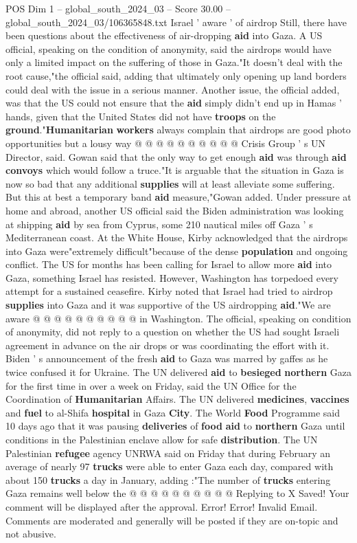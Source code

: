 \begin{textsample}{POS Dim 1 – global\_south\_2024\_03 – Score 30.00 – global\_south\_2024\_03/106365848.txt}
Israel ' aware ' of airdrop Still, there have been questions about the effectiveness of air-dropping \textbf{aid} into Gaza.
A US official, speaking on the condition of anonymity, said the airdrops would have only a limited impact on the suffering of those in Gaza."It doesn't deal with the root cause,"the official said, adding that ultimately only opening up land borders could deal with the issue in a serious manner.
Another issue, the official added, was that the US could not ensure that the \textbf{aid} simply didn't end up in Hamas ' hands, given that the United States did not have \textbf{troops} on the \textbf{ground}."\textbf{Humanitarian} \textbf{workers} always complain that airdrops are good photo opportunities but a lousy way @ @ @ @ @ @ @ @ @ @ Crisis Group ' s UN Director, said.
Gowan said that the only way to get enough \textbf{aid} was through \textbf{aid} \textbf{convoys} which would follow a truce."It is arguable that the situation in Gaza is now so bad that any additional \textbf{supplies} will at least alleviate some suffering.
But this at best a temporary band \textbf{aid} measure,"Gowan added.
Under pressure at home and abroad, another US official said the Biden administration was looking at shipping \textbf{aid} by sea from Cyprus, some 210 nautical miles off Gaza ' s Mediterranean coast.
At the White House, Kirby acknowledged that the airdrops into Gaza were"extremely difficult"because of the dense \textbf{population} and ongoing conflict.
The US for months has been calling for Israel to allow more \textbf{aid} into Gaza, something Israel has resisted.
However, Washington has torpedoed every attempt for a sustained ceasefire.
Kirby noted that Israel had tried to airdrop \textbf{supplies} into Gaza and it was supportive of the US airdropping \textbf{aid}."We are aware @ @ @ @ @ @ @ @ @ @ in Washington.
The official, speaking on condition of anonymity, did not reply to a question on whether the US had sought Israeli agreement in advance on the air drops or was coordinating the effort with it.
Biden ' s announcement of the fresh \textbf{aid} to Gaza was marred by gaffes as he twice confused it for Ukraine.
The UN delivered \textbf{aid} to \textbf{besieged} \textbf{northern} Gaza for the first time in over a week on Friday, said the UN Office for the Coordination of \textbf{Humanitarian} Affairs.
The UN delivered \textbf{medicines}, \textbf{vaccines} and \textbf{fuel} to al-Shifa \textbf{hospital} in Gaza \textbf{City}.
The World \textbf{Food} Programme said 10 days ago that it was pausing \textbf{deliveries} of \textbf{food} \textbf{aid} to \textbf{northern} Gaza until conditions in the Palestinian enclave allow for safe \textbf{distribution}.
The UN Palestinian \textbf{refugee} agency UNRWA said on Friday that during February an average of nearly 97 \textbf{trucks} were able to enter Gaza each day, compared with about 150 \textbf{trucks} a day in January, adding :"The number of \textbf{trucks} entering Gaza remains well below the @ @ @ @ @ @ @ @ @ @ Replying to X Saved!
Your comment will be displayed after the approval.
Error!
Error!
Invalid Email.
Comments are moderated and generally will be posted if they are on-topic and not abusive.


\end{textsample}
